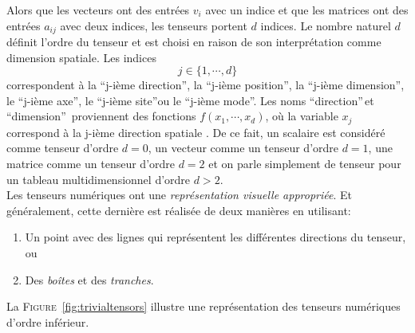 \documentclass[11pt,a4paper,oneside]{book}
\newcommand{\figref}[1]{\textsc{Figure}~\ref{#1}}
\begin{document}
Alors que les vecteurs ont des entrées $ v_{i} $ avec un indice et que les matrices ont des entrées $ a_{ij} $ avec deux indices, les tenseurs portent $ d $ indices. Le nombre naturel $ d $ définit l'ordre du tenseur et est choisi en raison  de son interprétation comme dimension spatiale.
Les indices $$ j\in\{1,\cdots,d\} $$ correspondent à la \textquotedblleft j-ième direction\textquotedblright, la \textquotedblleft j-ième position\textquotedblright, la \textquotedblleft j-ième dimension\textquotedblright, le \textquotedblleft j-ième axe\textquotedblright, le \textquotedblleft j-ième site\textquotedblright ou le \textquotedblleft j-ième mode\textquotedblright. Les noms \textquotedblleft direction\textquotedblright\,et \textquotedblleft dimension\textquotedblright\, proviennent des fonctions $ f(x_{1},\cdots,x_{d}) $, où la variable $ x_{j} $ correspond à la j-ième direction spatiale \cite[p.3]{hackbusch2012tensor}. De ce fait, un scalaire est considéré comme tenseur d'ordre $ d=0 $, un vecteur comme un tenseur d’ordre $ d = 1 $, une matrice
comme un tenseur d’ordre $ d = 2 $ et on parle simplement de tenseur pour un tableau multidimensionnel d’ordre $ d > 2 $.\\
Les tenseurs numériques ont une  \textit{représentation visuelle appropriée}. Et généralement, cette dernière est réalisée de deux manières en utilisant:
\begin{enumerate}
\item Un point avec des lignes qui représentent  les différentes directions du tenseur, ou
\item Des \textit{boîtes} et des \textit{tranches}.
\end{enumerate}
La \figref{fig:trivialtensors} illustre une représentation des tenseurs numériques d'ordre inférieur.
\end{document}
